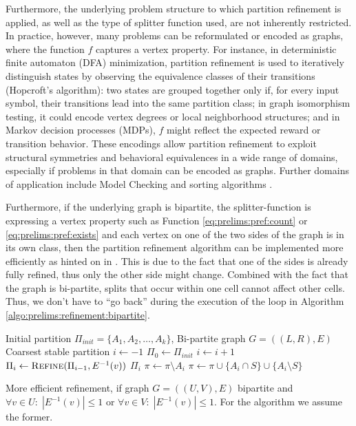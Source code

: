 		Furthermore, the underlying problem structure to which partition refinement is applied, as well as the type of splitter function used, are not inherently restricted. In practice, however, many problems can be reformulated or encoded as graphs, where the function $f$ captures a vertex property. 
		For instance, in deterministic finite automaton (DFA) minimization, partition refinement is used to iteratively distinguish states by observing the equivalence classes of their transitions (Hopcroft's algorithm): two states are grouped together only if, for every input symbol, their transitions lead into the same partition class; in graph isomorphism testing, it could encode vertex degrees or local neighborhood structures; and in Markov decision processes (MDPs), $f$ might reflect the expected reward or transition behavior.
		These encodings allow partition refinement to exploit structural symmetries and behavioral equivalences in a wide range of domains, especially if problems in that domain can be encoded as graphs.
		Further domains of application include Model Checking \cite{baierPrinciplesModelChecking2008} and sorting algorithms \cite{mehlhornAlgorithmsDataStructures2008}.

		Furthermore, if the underlying graph is bipartite, the splitter-function is expressing a vertex property such as Function \ref{eq:prelims:pref:count} or \ref{eq:prelims:pref:exists} and each vertex on one of the two sides of the graph is in its own class, then the partition refinement algorithm can be implemented more efficiently as hinted on in \cite{salvagninDetectingSemanticGroups2016}.
		This is due to the fact that one of the sides is already fully refined, thus only the other side might change. Combined with the fact that the graph is bi-partite, splits that occur within one cell cannot affect other cells.
		Thus, we don't have to \enquote{go back} during the execution of the loop in Algorithm \ref{algo:prelims:refinement:bipartite}.

		\begin{algorithm}[ht!]
			\centering
			\begin{algorithmic}
				\Require Initial partition $\Pi_{init} = \{ A_1, A_2, \ldots, A_k \}$, Bi-partite graph $G = ((L, R), E)$
				\Ensure Coarsest stable partition
				\Statex
					\State $i \gets -1$
					\State $\Pi_0 \gets \Pi_{init}$
						\State $i \gets i + 1$
						\State $\Pi_{i} \gets \Call{Refine}{\Pi_{i-1}, E^{-1}(v)}$
					\EndFor
					\State \Return $\Pi_i$
				\EndFunction
				\Statex
						\State $\pi \gets \pi \setminus A_i$
						\State $\pi \gets \pi \cup \{ A_i \cap S \} \cup \{ A_i \setminus S \}$ 
					\EndFor
				\EndFunction
			\end{algorithmic}
			\caption{More efficient refinement, if graph $G=((U, V), E)$ bipartite and $\forall v \in U:\; |E^{-1}(v)| \leq 1$ or $\forall v \in V:\; |E^{-1}(v)| \leq 1$. For the algorithm we assume the former.}
			\label{algo:prelims:refinement:bipartite}
		\end{algorithm}

